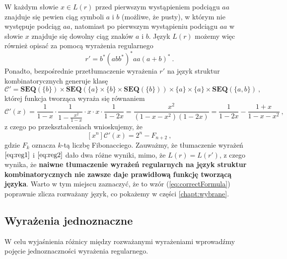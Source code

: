 W każdym słowie $x \in L(r)$ przed pierwszym wystąpieniem podciągu $aa$ znajduje się pewien ciąg symboli $a$ i $b$ (możliwe, że pusty), w którym nie występuje podciąg $aa$, natomiast po pierwszym wystąpieniu podciągu $aa$ w słowie $x$ znajduje się dowolny ciąg znaków $a$ i $b$. Język $L(r)$ możemy więc również opisać za pomocą wyrażenia regularnego
\begin{equation} \label{eq:reg2}
    r' = b^*(abb^*)^*aa(a+b)^*~.
\end{equation}
Ponadto, bezpośrednie przetłumaczenie wyrażenia $r'$ na język struktur kombinatorycznych generuje klasę
$$
  \mathcal{C'} = \mathbf{SEQ}(\{b\})\times\mathbf{SEQ}(\{a\}\times\{b\}\times\mathbf{SEQ}(\{b\}))\times\{a\}\times\{a\}\times\mathbf{SEQ}(\{a,b\})~,
$$
której funkcja tworząca wyraża się równaniem
$$
  \mathcal{C'}(x) = \frac{1}{1-x}\cdot \frac{1}{1-\frac{x^2}{1-x}} \cdot x \cdot x \cdot \frac{1}{1-2x} = \frac{x^2}{(1-x-x^2)(1-2x)} = \frac{1}{1-2x}-\frac{1+x}{1-x-x^2}~,
$$
z czego po przekształceniach wnioskujemy, że
\begin{equation}\label{eq:correctFormula}
  [x^n]\mathcal{C'}(x) = 2^n - F_{n+2}~,
\end{equation}
gdzie $F_k$ oznacza $k$-tą liczbę Fibonacciego. Zauważmy, że tłumaczenie wyrażeń $\ref{eq:reg1}$ i $\ref{eq:reg2}$ dało dwa różne wyniki, mimo, że $L(r)=L(r')$, z czego wynika, że \textbf{naiwne tłumaczenie wyrażeń regularnych na język struktur kombinatorycznych nie zawsze daje prawidłową funkcję tworzącą języka}. 
Warto w tym miejscu zaznaczyć, że to wzór (\ref{eq:correctFormula}) poprawnie zlicza rozważany język, co pokażemy w części \ref{chapt:wybrane}.

\subsection{Wyrażenia jednoznaczne}

W celu wyjaśnienia różnicy między rozważanymi wyrażeniami wprowadźmy pojęcie jednoznaczności wyrażenia regularnego.


